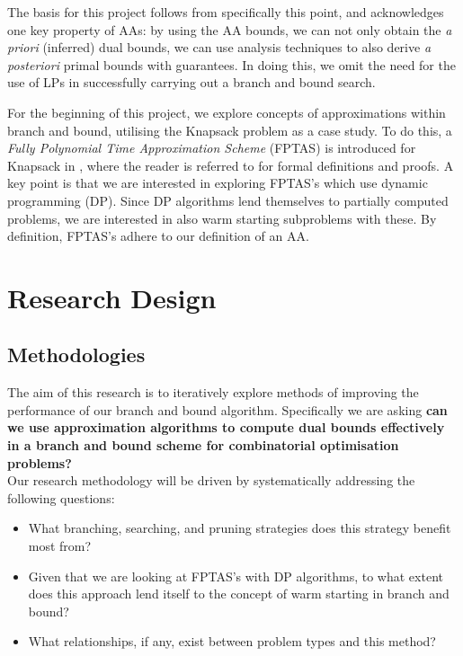 \documentclass[12pt, a4paper]{article}
\begin{document}
The basis for this project follows from specifically this point, and acknowledges one key property of AAs: by using the AA bounds, we can not only obtain the \textit{a priori} (inferred) dual bounds, we can use analysis techniques to also derive \textit{a posteriori} primal bounds with guarantees. In doing this, we omit the need for the use of LPs in successfully carrying out a branch and bound search.

For the beginning of this project, we explore concepts of approximations within branch and bound, utilising the Knapsack problem as a case study. To do this, a \textit{Fully Polynomial Time Approximation Scheme} (FPTAS) is introduced for Knapsack in \cite{BOOK:2}, where the reader is referred to for formal definitions and proofs. A key point is that we are interested in exploring FPTAS's which use dynamic programming (DP). Since DP algorithms lend themselves to partially computed problems, we are interested in also warm starting subproblems with these. By definition, FPTAS's adhere to our definition of an AA.

\section{Research Design}

\subsection{Methodologies}

The aim of this research is to iteratively explore methods of improving the performance of our branch and bound algorithm. Specifically we are asking \textbf{can we use approximation algorithms to compute dual bounds effectively in a branch and bound scheme for combinatorial optimisation problems?}\\

Our research methodology will be driven by systematically addressing the following questions:

\begin{itemize}
\item What branching, searching, and pruning strategies does this strategy benefit most from?
\item Given that we are looking at FPTAS's with DP algorithms, to what extent does this approach lend itself to the concept of warm starting in branch and bound?
\item What relationships, if any, exist between problem types and this method?
\end{itemize}
\end{document}
